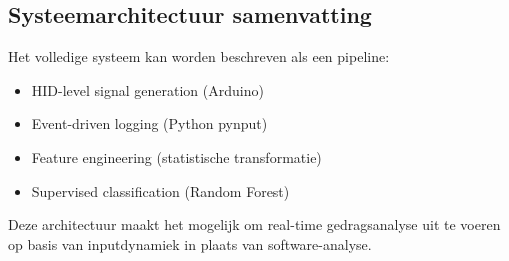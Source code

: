 \subsection{Systeemarchitectuur samenvatting}

Het volledige systeem kan worden beschreven als een pipeline:

\begin{itemize}
    \item HID-level signal generation (Arduino)
    \item Event-driven logging (Python pynput)
    \item Feature engineering (statistische transformatie)
    \item Supervised classification (Random Forest)
\end{itemize}

Deze architectuur maakt het mogelijk om real-time gedragsanalyse uit te voeren op basis van inputdynamiek in plaats van software-analyse.